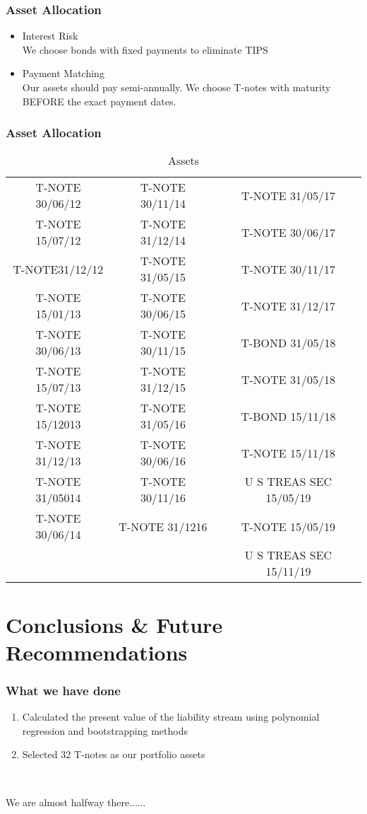 \documentclass[compress,handout,10pt]{beamer}
\let\olditem\item
\renewcommand{\item}{\setlength{\itemsep}{0.5\baselineskip}\olditem}
\begin{document}
\begin{frame}
    \frametitle{Asset Allocation}
\begin{itemize}
\item Interest Risk \\
We choose bonds with fixed payments to eliminate TIPS
\vspace{8mm}
\item Payment Matching\\
Our assets should pay semi-annually. We choose T-notes with maturity BEFORE the exact payment dates. 
\end{itemize}
\end{frame}

\begin{frame}
    \frametitle{Asset Allocation}
\begin{table}[h]
\centering  
\begin{tabular}[width=6cm,height=4.5cm]{ccc}
\hline
T-NOTE 30/06/12  &T-NOTE 30/11/14       &T-NOTE  31/05/17\\
T-NOTE 15/07/12   &T-NOTE 31/12/14        &T-NOTE 30/06/17\\
T-NOTE31/12/12   &T-NOTE  31/05/15   &T-NOTE 30/11/17\\
T-NOTE 15/01/13    &T-NOTE 30/06/15  & T-NOTE 31/12/17\\
T-NOTE 30/06/13  & T-NOTE 30/11/15   &T-BOND  31/05/18\\
T-NOTE 15/07/13    &T-NOTE 31/12/15   &T-NOTE  31/05/18\\
T-NOTE 15/12013   &T-NOTE 31/05/16   &T-BOND 15/11/18\\
T-NOTE 31/12/13  & T-NOTE 30/06/16   &T-NOTE 15/11/18\\
T-NOTE 31/05014   &T-NOTE 30/11/16   &U S TREAS SEC 15/05/19\\
T-NOTE 30/06/14   &T-NOTE 31/1216  &T-NOTE 15/05/19\\
                                                &&U S TREAS SEC 15/11/19\\\hline
\end{tabular}
\caption{Assets}
\end{table}
\end{frame}



\section{Conclusions \& Future Recommendations}
\begin{frame}
    \frametitle{What we have done}
\begin{enumerate}
\item Calculated the present value of the liability stream using polynomial regression and bootstrapping methods\\
\item Selected 32 T-notes as our portfolio assets\\
\end{enumerate}
\vspace{15mm}
\huge\centerline\emph\ {We are almost halfway there......}
\end{frame}
\end{document}
